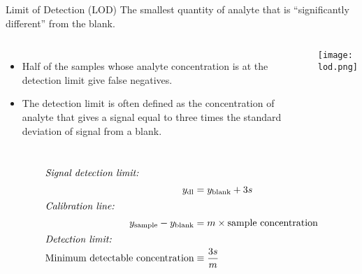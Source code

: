 \documentclass[notes=show]{beamer}
\begin{document}

\begin{frame}[allowframebreaks]{Limit of Detection (LOD)}
	The smallest quantity of analyte that is ``significantly different''
	from the blank.

	\begin{columns}
		\begin{itemize}
			\item Half of the samples whose analyte concentration is
				at the detection limit give \alert{false
				negatives}.
			\item The detection limit is often defined as the
				concentration of analyte that gives a signal
				equal to three times the standard deviation of
				signal from a blank.
		\end{itemize}
		\begin{center}
			\texttt{[image: lod.png]}
		\end{center}
	\end{columns}

	\framebreak

	\begin{align*}
		\intertext{\textit{Signal detection limit:}}
		y_\text{dl} &= y_\text{blank} + 3s \\
		\intertext{\textit{Calibration line:}}
		y_\text{sample} - y_\text{blank} &= m \times \text{sample
		concentration} \\
		\intertext{\textit{Detection limit:}}
		\text{Minimum detectable concentration} &\equiv \dfrac{3s}{m}
	\end{align*}
\end{frame}

\end{document}
